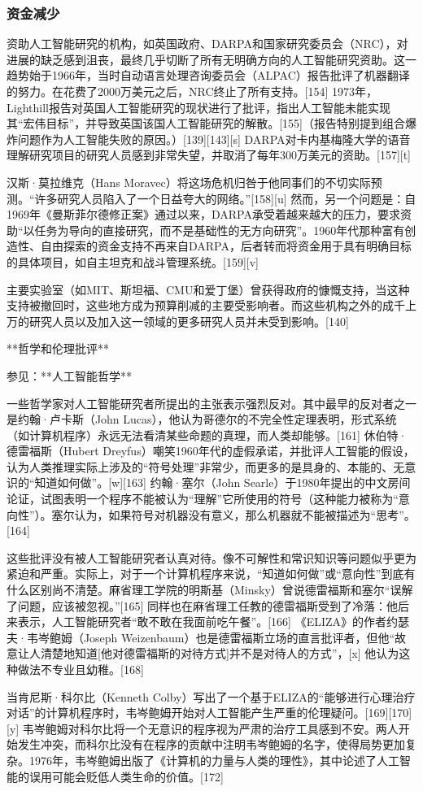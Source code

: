 \subsubsection{资金减少}
资助人工智能研究的机构，如英国政府、DARPA和国家研究委员会（NRC），对进展的缺乏感到沮丧，最终几乎切断了所有无明确方向的人工智能研究资助。这一趋势始于1966年，当时自动语言处理咨询委员会（ALPAC）报告批评了机器翻译的努力。在花费了2000万美元之后，NRC终止了所有支持。[154] 1973年，Lighthill报告对英国人工智能研究的现状进行了批评，指出人工智能未能实现其“宏伟目标”，并导致英国该国人工智能研究的解散。[155]（报告特别提到组合爆炸问题作为人工智能失败的原因。）[139][143][s] DARPA对卡内基梅隆大学的语音理解研究项目的研究人员感到非常失望，并取消了每年300万美元的资助。[157][t]

汉斯·莫拉维克（Hans Moravec）将这场危机归咎于他同事们的不切实际预测。“许多研究人员陷入了一个日益夸大的网络。”[158][u] 然而，另一个问题是：自1969年《曼斯菲尔德修正案》通过以来，DARPA承受着越来越大的压力，要求资助“以任务为导向的直接研究，而不是基础性的无方向研究”。1960年代那种富有创造性、自由探索的资金支持不再来自DARPA，后者转而将资金用于具有明确目标的具体项目，如自主坦克和战斗管理系统。[159][v]

主要实验室（如MIT、斯坦福、CMU和爱丁堡）曾获得政府的慷慨支持，当这种支持被撤回时，这些地方成为预算削减的主要受影响者。而这些机构之外的成千上万的研究人员以及加入这一领域的更多研究人员并未受到影响。[140]

**哲学和伦理批评**

参见：**人工智能哲学**

一些哲学家对人工智能研究者所提出的主张表示强烈反对。其中最早的反对者之一是约翰·卢卡斯（John Lucas），他认为哥德尔的不完全性定理表明，形式系统（如计算机程序）永远无法看清某些命题的真理，而人类却能够。[161] 休伯特·德雷福斯（Hubert Dreyfus）嘲笑1960年代的虚假承诺，并批评人工智能的假设，认为人类推理实际上涉及的“符号处理”非常少，而更多的是具身的、本能的、无意识的“知道如何做”。[w][163] 约翰·塞尔（John Searle）于1980年提出的中文房间论证，试图表明一个程序不能被认为“理解”它所使用的符号（这种能力被称为“意向性”）。塞尔认为，如果符号对机器没有意义，那么机器就不能被描述为“思考”。[164]

这些批评没有被人工智能研究者认真对待。像不可解性和常识知识等问题似乎更为紧迫和严重。实际上，对于一个计算机程序来说，“知道如何做”或“意向性”到底有什么区别尚不清楚。麻省理工学院的明斯基（Minsky）曾说德雷福斯和塞尔“误解了问题，应该被忽视。”[165] 同样也在麻省理工任教的德雷福斯受到了冷落：他后来表示，人工智能研究者“敢不敢在我面前吃午餐”。[166] 《ELIZA》的作者约瑟夫·韦岑鲍姆（Joseph Weizenbaum）也是德雷福斯立场的直言批评者，但他“故意让人清楚地知道[他对德雷福斯的对待方式]并不是对待人的方式”，[x] 他认为这种做法不专业且幼稚。[168]

当肯尼斯·科尔比（Kenneth Colby）写出了一个基于ELIZA的“能够进行心理治疗对话”的计算机程序时，韦岑鲍姆开始对人工智能产生严重的伦理疑问。[169][170][y] 韦岑鲍姆对科尔比将一个无意识的程序视为严肃的治疗工具感到不安。两人开始发生冲突，而科尔比没有在程序的贡献中注明韦岑鲍姆的名字，使得局势更加复杂。1976年，韦岑鲍姆出版了《计算机的力量与人类的理性》，其中论述了人工智能的误用可能会贬低人类生命的价值。[172]